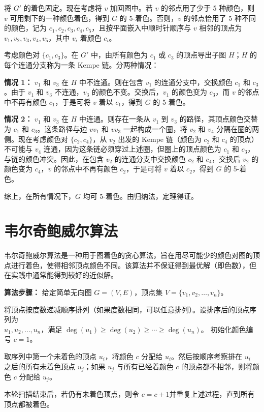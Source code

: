 \documentclass[lang=cn,11pt]{elegantbook}
\begin{document}
    将 $G'$ 的着色固定。现在考虑将 $v$ 加回图中。若 $v$ 的邻点用了少于 5 种颜色，则 $v$ 可用剩下的一种颜色着色，得到 $G$ 的 5-着色。否则，$v$ 的邻点恰用了 5 种不同的颜色，记为 $c_1, c_2, c_3, c_4, c_5$，且按平面嵌入中顺时针顺序与 $v$ 相邻的顶点为 $v_1, v_2, v_3, v_4, v_5$，其中 $v_i$ 着颜色 $c_i$。

    考虑颜色对 $\{c_1, c_3\}$。在 $G'$ 中，由所有颜色为 $c_1$ 或 $c_3$ 的顶点导出子图 $H$；$H$ 的每个连通分支称为一条 Kempe 链。分两种情况：

    \textbf{情况 1：} $v_1$ 和 $v_3$ 在 $H$ 中不连通。则在包含 $v_1$ 的连通分支中，交换颜色 $c_1$ 和 $c_3$。由于 $v_1$ 和 $v_3$ 不连通，$v_3$ 的颜色不变。交换后，$v_1$ 的颜色变为 $c_3$，而 $v$ 的邻点中不再有颜色 $c_1$，于是可将 $v$ 着以 $c_1$，得到 $G$ 的 5-着色。

    \textbf{情况 2：} $v_1$ 和 $v_3$ 在 $H$ 中连通。则存在一条从 $v_1$ 到 $v_3$ 的路径，其顶点颜色交替为 $c_1$ 和 $c_3$。这条路径与边 $v v_1$ 和 $v v_3$ 一起构成一个圈，将 $v_2$ 和 $v_4$ 分隔在圈的两侧。现在考虑颜色对 $\{c_2, c_4\}$，从 $v_2$ 出发的 Kempe 链（颜色为 $c_2$ 和 $c_4$ 的顶点）不可能与 $v_4$ 连通，因为这条链必须穿过上述圈，但圈上的顶点颜色为 $c_1$ 和 $c_3$，与链的颜色冲突。因此，在包含 $v_2$ 的连通分支中交换颜色 $c_2$ 和 $c_4$，交换后 $v_2$ 的颜色变为 $c_4$，$v$ 的邻点中不再有颜色 $c_2$，于是可将 $v$ 着以 $c_2$，得到 $G$ 的 5-着色。

    综上，在所有情况下，$G$ 均可 5-着色。由归纳法，定理得证。
\section{韦尔奇鲍威尔算法}
    韦尔奇鲍威尔算法是一种用于图着色的贪心算法，旨在用尽可能少的颜色对图的顶点进行着色，使得相邻顶点颜色不同。该算法并不保证得到最优解（即色数），但在实践中通常能得到较好的近似解。

    \textbf{算法步骤：}
    给定简单无向图 $G=(V,E)$，顶点集 $V=\{v_1,v_2,\ldots,v_n\}$。
    
         将顶点按度数递减顺序排列（如果度数相同，可以任意排列）。设排序后的顶点序列为\\$u_1,u_2,\ldots,u_n$，满足 $\deg(u_1) \ge \deg(u_2) \ge \cdots \ge \deg(u_n)$。
         初始化颜色编号 $c=1$。

         取序列中第一个未着色的顶点 $u_i$，将颜色 $c$ 分配给 $u_i$。然后按顺序考察排在 $u_i$ 之后的所有未着色顶点 $u_j$；如果 $u_j$ 与所有已经着颜色 $c$ 的顶点都不相邻，则将颜色 $c$ 分配给 $u_j$。

         本轮扫描结束后，若仍有未着色顶点，则令 $c=c+1$并重复上述过程，直到所有顶点都被着色。
    
\end{document}
